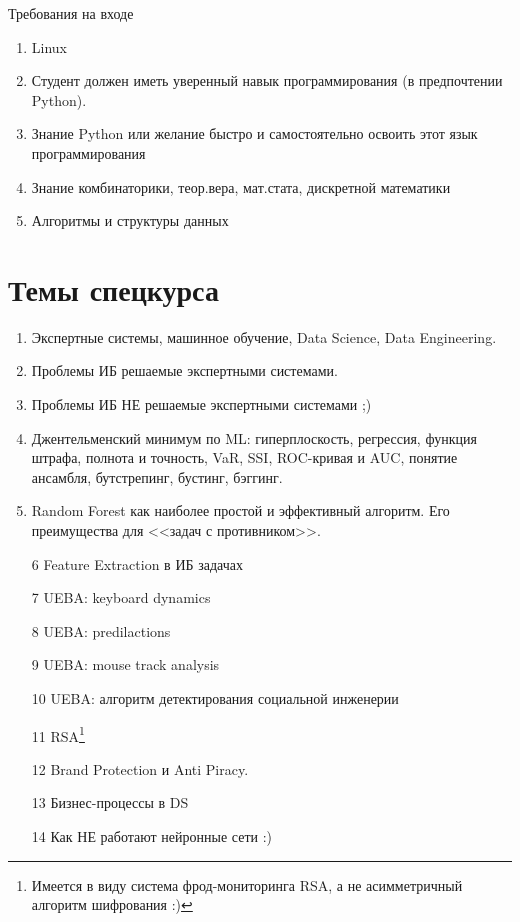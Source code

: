 \documentclass{beamer}
\newcommand{\рис}[1]{рис.\ref{#1}}
\newcommand{\Рис}[1]{Рис.\ref{#1}}
\newcommand{\таблицa}[1]{таблица~№\ref{#1}} %
\newcommand{\таблицы}[1]{таблицы~№\ref{#1}} %
\newcommand{\таблице}[1]{таблице~№\ref{#1}} %
\newcommand{\таблицу}[1]{таблицу~№\ref{#1}} %
\newcommand{\таблицей}[1]{таблицей~№\ref{#1}} %
\newcommand{\Таблицa}[1]{Таблица~№\ref{#1}} %
\newcommand{\Таблицы}[1]{Таблицы~№\ref{#1}} %
\newcommand{\Таблице}[1]{Таблице~№\ref{#1}} %
\newcommand{\Таблицу}[1]{Таблицу~№\ref{#1}} %
\newcommand{\Таблицей}[1]{Таблицей~№\ref{#1}} %
\begin{document}
  \begin{frame}{Требования на входе}
  \begin{enumerate}
  	\item Linux
  	\item Студент должен иметь уверенный навык программирования
  	(в предпочтении Python).
  	\item Знание Python или желание быстро и самостоятельно освоить этот 
  	язык программирования
  	\item Знание комбинаторики, теор.вера, мат.стата, дискретной математики
  	\item Алгоритмы и структуры данных
  \end{enumerate}
  \end{frame}

  \section{Темы спецкурса}\label{section:topics}
  
  \begin{frame}
	\begin{enumerate}
	\item Экспертные системы, машинное обучение, Data Science, Data Engineering.
	\item Проблемы ИБ решаемые экспертными системами.
	\item Проблемы ИБ НЕ решаемые экспертными системами ;)
	\item Джентельменский минимум по ML: гиперплоскость, регрессия, функция штрафа, полнота и точность, VaR, SSI, ROC-кривая и AUC, понятие ансамбля, бутстрепинг, бустинг, бэггинг.
	\item Random Forest как наиболее простой и эффективный алгоритм. Его преимущества для 
	<<задач с противником>>.
	\item[6] Feature Extraction в ИБ задачах
	\end{enumerate}
\end{frame}

  \begin{frame}
\begin{enumerate}
	\item[7] UEBA: keyboard dynamics
	\item[8] UEBA: predilactions
	\item[9] UEBA: mouse track analysis
	\item[10] UEBA: алгоритм детектирования социальной инженерии
	\item[11] RSA\footnote{Имеется в виду система фрод-мониторинга RSA, а не асимметричный алгоритм шифрования :)} 
	\item[12] Brand Protection и Anti Piracy.
	\item[13] Бизнес-процессы в DS
	\item[14] Как НЕ работают нейронные сети :)
\end{enumerate}
\end{frame}
\end{document}
